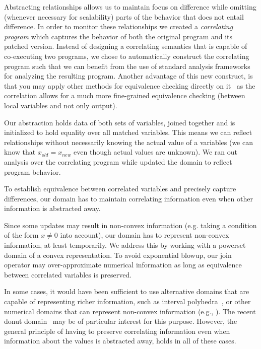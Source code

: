 Abstracting relationships allows us to maintain focus on difference while
omitting (whenever necessary for scalability) parts of the behavior that does
not entail difference. In order to monitor these relationships we created a
\emph{correlating program} which captures the behavior of both the original
program and its patched version. Instead of designing a correlating semantics
that is capable of co-executing two programs, we chose to automatically
construct the correlating program such that we can benefit from the use of
standard analysis frameworks for analyzing the resulting program. Another
advantage of this new construct, is that you may apply other methods for
equivalence checking directly on it~\cite{EnglerRamos11} as the correlation
allows for a much more fine-grained equivalence checking (between local
variables and not only output).

Our abstraction holds data of both sets of variables, joined together and is
initialized to hold equality over all matched variables. This means we can
reflect relationships without necessarily knowing the actual value of a
variables (we can know that $x_{old} = x_{new}$ even though actual values are
unknown). We ran out analysis over the correlating program while updated the
domain to reflect program behavior.

To establish equivalence between correlated variables and precisely capture
differences, our domain has to maintain correlating information even when
other information is abstracted away.

Since some updates may result in non-convex information (e.g. taking  a
condition of the form $x \neq 0$ into account), our domain has to represent
non-convex information, at least temporarily. We address this by working with
a powerset domain of a convex representation. To avoid exponential blowup,
our join operator may over-approximate numerical information as long as
equivalence between correlated variables is preserved.

In some cases, it would have been sufficient to use alternative domains that
are capable of representing richer information, such as interval
polyhedra~\cite{CMWC:SAS09}, or other numerical domains that can represent
non-convex information (e.g., \cite{TODO}). The recent donut
domain~\cite{GIBMG:VMCAI12} may be of particular interest for this purpose.
However, the general principle of having to preserve correlating information
even when information about the values is abstracted away, holds in all of
these cases.

